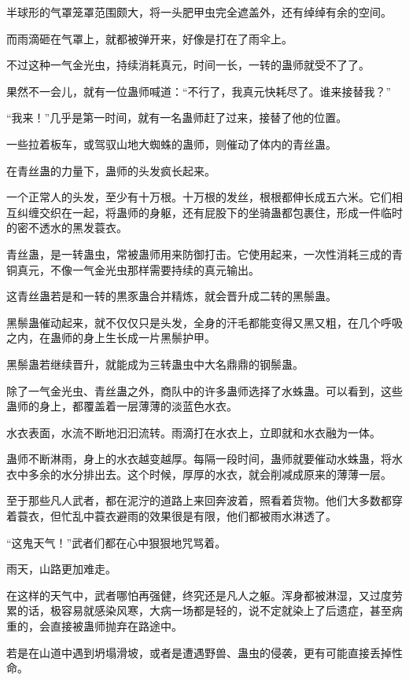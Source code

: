 \begin{this_body}
半球形的气罩笼罩范围颇大，将一头肥甲虫完全遮盖外，还有绰绰有余的空间。

而雨滴砸在气罩上，就都被弹开来，好像是打在了雨伞上。

不过这种一气金光虫，持续消耗真元，时间一长，一转的蛊师就受不了了。

果然不一会儿，就有一位蛊师喊道：“不行了，我真元快耗尽了。谁来接替我？”

“我来！”几乎是第一时间，就有一名蛊师赶了过来，接替了他的位置。

一些拉着板车，或驾驭山地大蜘蛛的蛊师，则催动了体内的青丝蛊。

在青丝蛊的力量下，蛊师的头发疯长起来。

一个正常人的头发，至少有十万根。十万根的发丝，根根都伸长成五六米。它们相互纠缠交织在一起，将蛊师的身躯，还有屁股下的坐骑蛊都包裹住，形成一件临时的密不透水的黑发蓑衣。

青丝蛊，是一转蛊虫，常被蛊师用来防御打击。它使用起来，一次性消耗三成的青铜真元，不像一气金光虫那样需要持续的真元输出。

这青丝蛊若是和一转的黒豕蛊合并精炼，就会晋升成二转的黑鬃蛊。

黑鬃蛊催动起来，就不仅仅只是头发，全身的汗毛都能变得又黑又粗，在几个呼吸之内，在蛊师的身上生长成一片黑鬃护甲。

黑鬃蛊若继续晋升，就能成为三转蛊虫中大名鼎鼎的钢鬃蛊。

除了一气金光虫、青丝蛊之外，商队中的许多蛊师选择了水蛛蛊。可以看到，这些蛊师的身上，都覆盖着一层薄薄的淡蓝色水衣。

水衣表面，水流不断地汩汩流转。雨滴打在水衣上，立即就和水衣融为一体。

蛊师不断淋雨，身上的水衣越变越厚。每隔一段时间，蛊师就要催动水蛛蛊，将水衣中多余的水分排出去。这个时候，厚厚的水衣，就会削减成原来的薄薄一层。

至于那些凡人武者，都在泥泞的道路上来回奔波着，照看着货物。他们大多数都穿着蓑衣，但忙乱中蓑衣避雨的效果很是有限，他们都被雨水淋透了。

“这鬼天气！”武者们都在心中狠狠地咒骂着。

雨天，山路更加难走。

在这样的天气中，武者哪怕再强健，终究还是凡人之躯。浑身都被淋湿，又过度劳累的话，极容易就感染风寒，大病一场都是轻的，说不定就染上了后遗症，甚至病重的，会直接被蛊师抛弃在路途中。

若是在山道中遇到坍塌滑坡，或者是遭遇野兽、蛊虫的侵袭，更有可能直接丢掉性命。


\end{this_body}
